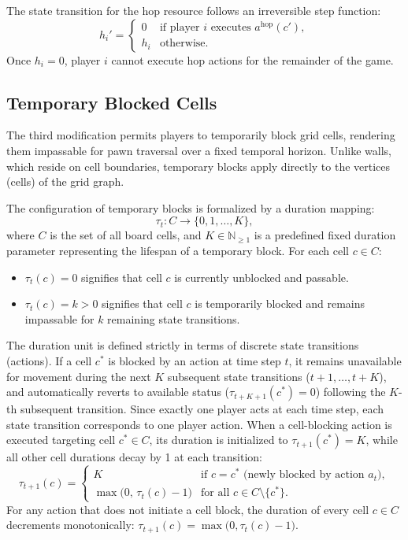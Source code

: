 \documentclass{article}
\begin{document}
The state transition for the hop resource follows an irreversible step function:
\begin{equation}
h_i' = \begin{cases}
0 & \text{if player } i \text{ executes } a^{\text{hop}}(c'), \\
h_i & \text{otherwise}.
\end{cases}
\end{equation}
Once $h_i = 0$, player $i$ cannot execute hop actions for the remainder of the game.

\subsection{Temporary Blocked Cells}
\label{subsec:temporary_blocked_cells}

The third modification permits players to temporarily block grid cells, rendering them impassable for pawn traversal over a fixed temporal horizon. Unlike walls, which reside on cell boundaries, temporary blocks apply directly to the vertices (cells) of the grid graph.

The configuration of temporary blocks is formalized by a duration mapping:
\begin{equation}
\tau_t : C \rightarrow \{0, 1, \dots, K\},
\end{equation}
where $C$ is the set of all board cells, and $K \in \mathbb{N}_{\ge 1}$ is a predefined fixed duration parameter representing the lifespan of a temporary block. For each cell $c \in C$:
\begin{itemize}
    \item $\tau_t(c) = 0$ signifies that cell $c$ is currently unblocked and passable.
    \item $\tau_t(c) = k > 0$ signifies that cell $c$ is temporarily blocked and remains impassable for $k$ remaining state transitions.
\end{itemize}

The duration unit is defined strictly in terms of discrete state transitions (actions). If a cell $c^*$ is blocked by an action at time step $t$, it remains unavailable for movement during the next $K$ subsequent state transitions ($t+1, \dots, t+K$), and automatically reverts to available status ($\tau_{t+K+1}(c^*) = 0$) following the $K$-th subsequent transition. Since exactly one player acts at each time step, each state transition corresponds to one player action. When a cell-blocking action is executed targeting cell $c^* \in C$, its duration is initialized to $\tau_{t+1}(c^*) = K$, while all other cell durations decay by 1 at each transition:
\begin{equation}
\label{eq:temporary_block_decay}
\tau_{t+1}(c) = \begin{cases}
K & \text{if } c = c^* \text{ (newly blocked by action } a_t), \\
\max\big(0, \, \tau_t(c) - 1\big) & \text{for all } c \in C \setminus \{c^*\}.
\end{cases}
\end{equation}
For any action that does not initiate a cell block, the duration of every cell $c \in C$ decrements monotonically: $\tau_{t+1}(c) = \max\big(0, \tau_t(c) - 1\big)$.
\end{document}
